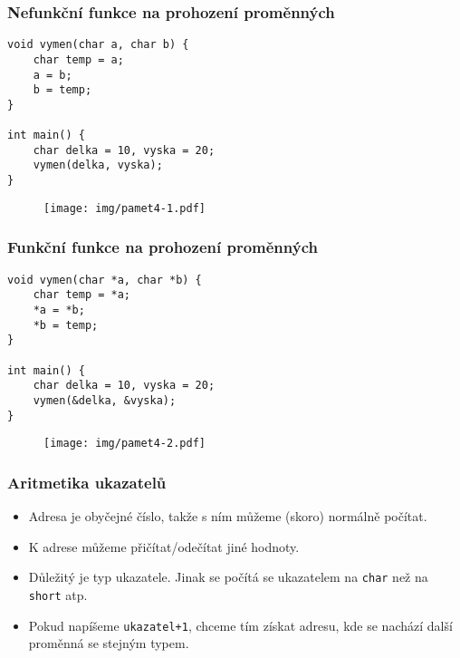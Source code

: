 \documentclass{beamer}
\newenvironment{itemizex}%
  {\large \begin{itemize}%
    \setlength{\itemsep}{8pt}%
    \setlength{\parskip}{8pt}}%
  {\end{itemize}}
\begin{document}
\begin{frame}[t,fragile]\frametitle{Nefunkční funkce na prohození proměnných} 
    \begin{verbatim} 
void vymen(char a, char b) {
    char temp = a;
    a = b;
    b = temp;
}

int main() {
    char delka = 10, vyska = 20;
    vymen(delka, vyska);
}
    \end{verbatim}

\begin{figure}[htb]
    \centering
    \texttt{[image: img/pamet4-1.pdf]}
\end{figure}
\end{frame}


\begin{frame}[t,fragile]\frametitle{Funkční funkce na prohození proměnných} 
\begin{verbatim} 
void vymen(char *a, char *b) {
    char temp = *a;
    *a = *b;
    *b = temp;
}

int main() {
    char delka = 10, vyska = 20;
    vymen(&delka, &vyska);
}
\end{verbatim}

\begin{figure}[htb]
    \centering
    \texttt{[image: img/pamet4-2.pdf]}
\end{figure}
\end{frame}







\begin{frame}[t,fragile]\frametitle{Aritmetika ukazatelů} 
    \begin{itemizex}
        \item Adresa je obyčejné číslo, takže s ním můžeme (skoro) normálně počítat.
        \item K adrese můžeme přičítat/odečítat jiné hodnoty.
        \item Důležitý je typ ukazatele. Jinak se počítá se ukazatelem na \texttt{char} než na \texttt{short} atp. 
        \item Pokud napíšeme \texttt{ukazatel+1}, chceme tím získat adresu, kde se nachází další proměnná se stejným typem.
    \end{itemizex}
\end{frame}
\end{document}
